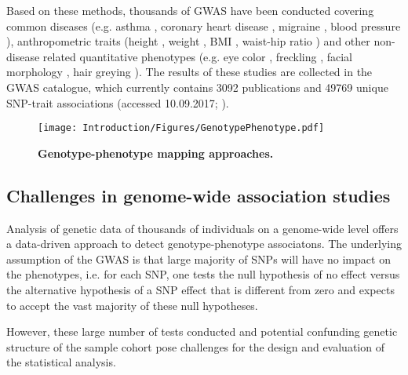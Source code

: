 
Based on these methods, thousands of GWAS have been conducted covering common diseases (e.g. asthma \citep{Noguchi201,Pickrell2016}, coronary heart disease \citep{Wild2011,Takeuchi2011,Lu2012}, migraine \citep{Pickrell2016,Gormley2016}, blood pressure \citep{Kato2011,Franceschini2013}), anthropometric traits (height \citep{Lango2010,Wood2014}, weight \citep{Willer2008}, BMI \citep{Speliotes2010,Yang2012}, waist-hip ratio \citep{Lindgren2009,Heid2010}) and other non-disease related quantitative phenotypes (e.g. eye color \citep{Erikson2010,Candille2012,Zhang2013}, freckling \citep{Sulem2008}, facial morphology \citep{Paternoster2012}, hair greying \citep{Adhikari2016}). The results of these studies are collected in the GWAS catalogue, which currently contains \num{3092} publications and \num{49769} unique SNP-trait associations (accessed 10.09.2017; \citep{MacArthur2017}). 


\begin{figure}[hbtp]
	\centering
	\texttt{[image: Introduction/Figures/GenotypePhenotype.pdf]}
	\caption[\textbf{Genotype-phenotype mapping approaches. }]{\textbf{Genotype-phenotype mapping approaches. } } 
	 	\label{fig:genotype-phenotype}
\end{figure}



\subsection{Challenges in genome-wide association studies}
Analysis of genetic data of thousands of individuals on a genome-wide level offers a data-driven approach to detect genotype-phenotype associatons. The underlying assumption of the GWAS is that large majority of SNPs will have no impact on the phenotypes, i.e. for each SNP, one tests the null hypothesis of no effect versus the alternative hypothesis of a SNP effect that is different from zero and expects to accept the vast majority of these null hypotheses.

However,  these large number of tests conducted and potential confunding genetic structure of the sample cohort pose challenges for the design and evaluation of the statistical analysis. 

